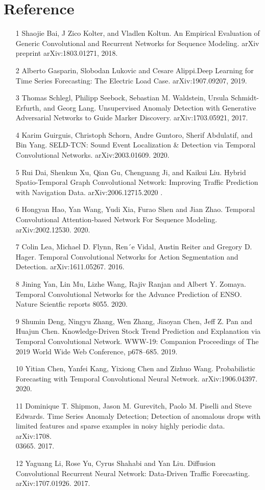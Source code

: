 \chapter*{Reference} 
\label{Reference} 


\begin{itemize}

\item[1] Shaojie Bai, J Zico Kolter, and Vladlen Koltun. An Empirical Evaluation of Generic Convolutional and Recurrent Networks for Sequence Modeling. arXiv preprint arXiv:1803.01271, 2018.
\item[2] Alberto Gasparin, Slobodan Lukovic and Cesare Alippi.Deep Learning for Time Series Forecasting: The Electric Load Case.  arXiv:1907.09207, 2019. 
\item[3] Thomas Schlegl, Philipp Seebock, Sebastian M. Waldstein,
Ursula Schmidt-Erfurth, and Georg Lang. Unsupervised Anomaly Detection with Generative Adversarial Networks to Guide Marker Discovery. arXiv:1703.05921, 2017. 
\item[4] Karim Guirguis, Christoph Schorn, Andre Guntoro, Sherif Abdulatif, and Bin Yang. SELD-TCN: Sound Event Localization & Detection via Temporal Convolutional Networks. arXiv:2003.01609. 2020.
\item[5] Rui Dai, Shenkun Xu, Qian Gu, Chenguang Ji, and Kaikui Liu. Hybrid Spatio-Temporal Graph Convolutional Network: Improving Traffic Prediction with Navigation Data. arXiv:2006.12715.2020 .
\item[6] Hongyan Hao, Yan Wang, Yudi Xia, Furao Shen and Jian Zhao. Temporal Convolutional Attention-based Network For Sequence Modeling. arXiv:2002.12530. 2020.
\item[7] Colin Lea, Michael D. Flynn, Ren´e Vidal, Austin Reiter and Gregory D. Hager. Temporal Convolutional Networks for Action Segmentation and Detection. arXiv:1611.05267. 2016.
\item[8] Jining Yan, Lin Mu, Lizhe Wang, Rajiv Ranjan and Albert Y. Zomaya. Temporal Convolutional Networks for the Advance Prediction of ENSO. Nature Scientfic reports 8055. 2020.
\item[9] Shumin Deng, Ningyu Zhang, Wen Zhang, Jiaoyan Chen, Jeff Z. Pan and Huajun Chen. Knowledge-Driven Stock Trend Prediction and Explanation via Temporal Convolutional Network. WWW-19: Companion Proceedings of The 2019 World Wide Web Conference, p678–685. 2019.
\item[10] Yitian Chen, Yanfei Kang, Yixiong Chen and Zizhuo Wang. Probabilistic Forecasting with Temporal Convolutional Neural Network. arXiv:1906.04397. 2020.
\item[11] Dominique T. Shipmon, Jason M. Gurevitch, Paolo M. Piselli and Steve Edwards. Time Series Anomaly Detection; Detection of anomalous drops with limited features and sparse examples in noisy highly periodic data. arXiv:1708.\\03665. 2017.
\item[12] Yaguang Li, Rose Yu, Cyrus Shahabi and Yan Liu. Diffusion Convolutional Recurrent Neural Network: Data-Driven Traffic Forecasting. arXiv:1707.01926. 2017.
\newpage
\thispagestyle{plain}


\end{itemize}

